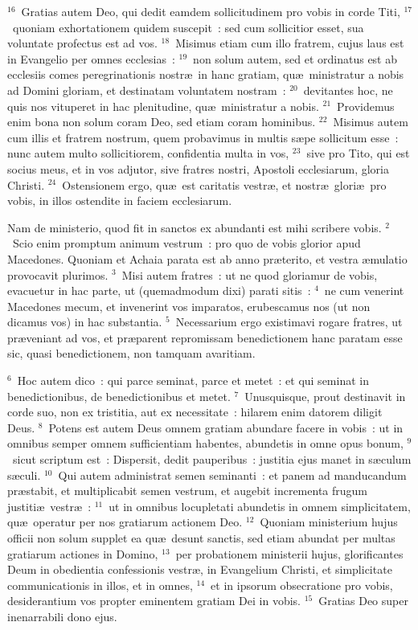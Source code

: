 ${}^{16}$~Gratias autem Deo, qui dedit eamdem sollicitudinem pro vobis in corde Titi,
${}^{17}$~quoniam exhortationem quidem suscepit~: sed cum sollicitior esset, sua voluntate profectus est ad vos.
${}^{18}$~Misimus etiam cum illo fratrem, cujus laus est in Evangelio per omnes ecclesias~:
${}^{19}$~non solum autem, sed et ordinatus est ab ecclesiis comes peregrinationis nostr\ae\ in hanc gratiam, qu\ae\ ministratur a nobis ad Domini gloriam, et destinatam voluntatem nostram~:
${}^{20}$~devitantes hoc, ne quis nos vituperet in hac plenitudine, qu\ae\ ministratur a nobis.
${}^{21}$~Providemus enim bona non solum coram Deo, sed etiam coram hominibus.
${}^{22}$~Misimus autem cum illis et fratrem nostrum, quem probavimus in multis s\ae pe sollicitum esse~: nunc autem multo sollicitiorem, confidentia multa in vos,
${}^{23}$~sive pro Tito, qui est socius meus, et in vos adjutor, sive fratres nostri, Apostoli ecclesiarum, gloria Christi.
${}^{24}$~Ostensionem ergo, qu\ae\ est caritatis vestr\ae , et nostr\ae\ glori\ae\ pro vobis, in illos ostendite in faciem ecclesiarum.

\lettrine[lines=3,image=true,loversize=0.05,lraise=-0.03]{N}{}am de ministerio, quod fit in sanctos ex abundanti est mihi scribere vobis.
${}^{2}$~Scio enim promptum animum vestrum~: pro quo de vobis glorior apud Macedones. Quoniam et Achaia parata est ab anno pr\ae terito, et vestra \ae mulatio provocavit plurimos.
${}^{3}$~Misi autem fratres~: ut ne quod gloriamur de vobis, evacuetur in hac parte, ut (quemadmodum dixi) parati sitis~:
${}^{4}$~ne cum venerint Macedones mecum, et invenerint vos imparatos, erubescamus nos (ut non dicamus vos) in hac substantia.
${}^{5}$~Necessarium ergo existimavi rogare fratres, ut pr\ae veniant ad vos, et pr\ae parent repromissam benedictionem hanc paratam esse sic, quasi benedictionem, non tamquam avaritiam.


${}^{6}$~Hoc autem dico~: qui parce seminat, parce et metet~: et qui seminat in benedictionibus, de benedictionibus et metet.
${}^{7}$~Unusquisque, prout destinavit in corde suo, non ex tristitia, aut ex necessitate~: hilarem enim datorem diligit Deus.
${}^{8}$~Potens est autem Deus omnem gratiam abundare facere in vobis~: ut in omnibus semper omnem sufficientiam habentes, abundetis in omne opus bonum,
${}^{9}$~sicut scriptum est~: Dispersit, dedit pauperibus~: justitia ejus manet in s\ae culum s\ae culi.
${}^{10}$~Qui autem administrat semen seminanti~: et panem ad manducandum pr\ae stabit, et multiplicabit semen vestrum, et augebit incrementa frugum justiti\ae\ vestr\ae~:
${}^{11}$~ut in omnibus locupletati abundetis in omnem simplicitatem, qu\ae\ operatur per nos gratiarum actionem Deo.
${}^{12}$~Quoniam ministerium hujus officii non solum supplet ea qu\ae\ desunt sanctis, sed etiam abundat per multas gratiarum actiones in Domino,
${}^{13}$~per probationem ministerii hujus, glorificantes Deum in obedientia confessionis vestr\ae , in Evangelium Christi, et simplicitate communicationis in illos, et in omnes,
${}^{14}$~et in ipsorum obsecratione pro vobis, desiderantium vos propter eminentem gratiam Dei in vobis.
${}^{15}$~Gratias Deo super inenarrabili dono ejus.

